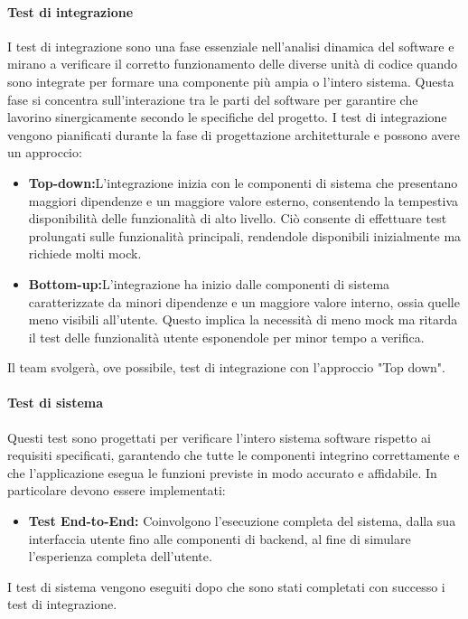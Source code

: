 \paragraph{Test di integrazione}
I test di integrazione sono una fase essenziale nell'analisi dinamica del software e mirano a verificare il corretto funzionamento delle diverse unità di codice quando sono integrate per formare una componente più ampia o l'intero sistema. Questa fase si concentra sull'interazione tra le parti del software per garantire che lavorino sinergicamente secondo le specifiche del progetto.
I test di integrazione vengono pianificati durante la fase di progettazione architetturale e possono avere un approccio:
\begin{itemize}
    \item \textbf{Top-down:}L'integrazione inizia con le componenti di sistema che presentano maggiori dipendenze e un maggiore valore esterno, consentendo la tempestiva disponibilità delle funzionalità di alto livello.
          Ciò consente di effettuare test prolungati sulle funzionalità principali, rendendole disponibili inizialmente ma richiede molti mock.
    \item \textbf{Bottom-up:}L'integrazione ha inizio dalle componenti di sistema caratterizzate da minori dipendenze e un maggiore valore interno, ossia quelle meno visibili all'utente. Questo implica la necessità di meno mock ma ritarda il test delle funzionalità
          utente esponendole per minor tempo a verifica.
\end{itemize}
Il team svolgerà, ove possibile, test di integrazione con l'approccio "Top down".

\paragraph{Test di sistema}
Questi test sono progettati per verificare l'intero sistema software rispetto ai requisiti specificati, garantendo che tutte le componenti integrino correttamente e che l'applicazione esegua le funzioni previste in modo accurato e affidabile.
In particolare devono essere implementati:
\begin{itemize}
    \item  \textbf{Test End-to-End:} Coinvolgono l'esecuzione completa del sistema, dalla sua interfaccia utente fino alle componenti di backend, al fine di simulare l'esperienza completa dell'utente.
\end{itemize}

I test di sistema vengono eseguiti dopo che sono stati completati con successo i test di integrazione.
